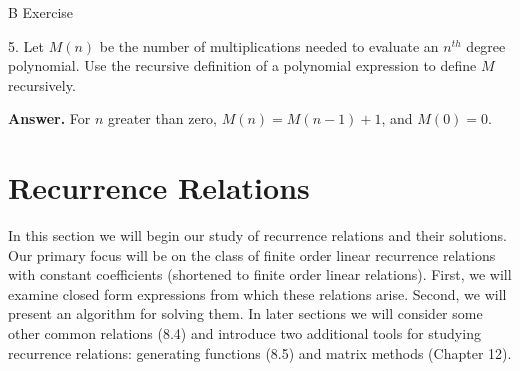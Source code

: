\documentclass[10pt,]{book}
\theoremstyle{plain}
\theoremstyle{definition}
\theoremstyle{definition}
\theoremstyle{definition}
\theoremstyle{definition}
\numberwithin{equation}{section}
\begin{document}
\par\smallskip\noindent
\hypertarget{exercisegroup-4}{}\typeout{************************************************}
\typeout{************************************************}
B Exercise%
\begin{exercisegroup}
\item[5.]\hypertarget{exercise-11}{} Let \(M(n)\) be the number of multiplications needed to evaluate an \(n^{th}\) degree polynomial. Use the recursive definition of a
polynomial expression to define \(M\) recursively.%
\par\smallskip
\par\smallskip
\noindent\textbf{Answer.}\hypertarget{answer-6}{}\quad
For \(n\) greater than zero, \(M(n)=M(n-1)+1\), and \(M(0)=0\).%
\end{exercisegroup}
\par\smallskip\noindent
\typeout{************************************************}
\typeout{************************************************}
\section[Recurrence Relations]{Recurrence Relations}\label{s-recurrence-relations}
\typeout{************************************************}
\typeout{************************************************}
In this section we will begin our study of recurrence relations and their solutions. Our primary focus will be on the class of finite order linear
recurrence relations with constant coefficients (shortened to finite order linear relations). First, we will examine closed form
expressions from which these relations arise. Second, we will present an algorithm for solving them. In later sections we will consider some other
common relations (8.4) and introduce two additional tools for studying recurrence relations: generating functions (8.5) and matrix methods (Chapter
12).%
\typeout{************************************************}
\typeout{************************************************}
\end{document}
